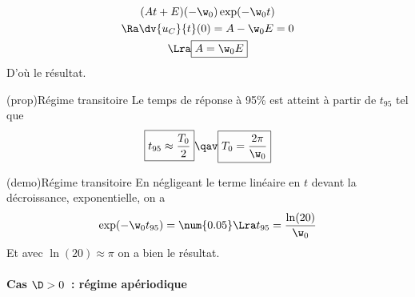 \documentclass[../../main/main.tex]{subfiles}
\begin{document}
\begin{tcbraster}[raster columns=2, raster equal height=rows]
\begin{tcb}[label=demo:solupseudoper]
\begin{gather*}
			(At+E)(-\w_0)\exp(-\w_0t)\\
			\Ra \dv{u_C}{t} (0) = A -\w_0E = 0\\
			\Lra \boxed{A = \w_0E}
		\end{gather*}
		D'où le résultat.
	\end{tcb}
	\begin{tcb}[label=prop:transicrit](prop){Régime transitoire}
		Le temps de réponse à 95\% est atteint à partir de $t_{95}$ tel que
		\begin{equation*}
			\boxed{t_{95} \approx \frac{T_0}{2}} \qav \boxed{T_0 = \frac{2\pi}{\w_0}}
		\end{equation*}
	\end{tcb}
	\begin{tcb}[label=demo:transicrit](demo){Régime transitoire}
		En négligeant le terme linéaire en $t$ devant la décroissance,
		exponentielle, on a
		\begin{gather*}
			\exp (-\w_0t_{95}) = \num{0.05} \Lra t_{95} =
			\frac{\ln(20)}{\w_0}
		\end{gather*}
		Et avec $\ln(20) \approx \pi$ on a bien le résultat.
	\end{tcb}
\end{tcbraster}

\paragraph{Cas $\D > 0$~: régime apériodique}
\end{document}
